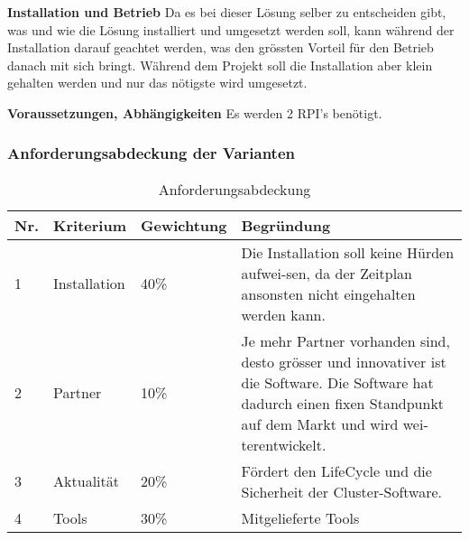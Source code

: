 \textbf{Installation und Betrieb}\newline
Da es bei dieser Lösung selber zu entscheiden gibt, was und wie die Lösung installiert und umgesetzt werden soll, kann während der Installation darauf geachtet werden, was den grössten Vorteil für den Betrieb danach mit sich bringt. Während dem Projekt soll die Installation aber klein gehalten werden und nur das nötigste wird umgesetzt. 

\textbf{Voraussetzungen, Abhängigkeiten}\newline
Es werden 2 RPI's benötigt.

\subsubsection{Anforderungsabdeckung der Varianten}

\begin{table}[H]
\centering
\begin{tabular}{p{1cm}p{2.5cm}p{2.2cm}p{10.3cm}}
\hline
\rowcolor{heading} \textbf{Nr.} & \textbf{Kriterium} & \textbf{Gewichtung} &\textbf{Begründung} \\\hline
1 & Installation & 40\% & Die Installation soll keine Hürden aufwei-sen, da der Zeitplan ansonsten nicht eingehalten werden kann. \\\hline
2 & Partner & 10\% & Je mehr Partner vorhanden sind, desto grösser und innovativer ist die Software. Die Software hat dadurch einen fixen Standpunkt auf dem Markt und wird wei-terentwickelt. \\\hline
3 & Aktualität & 20\% & Fördert den LifeCycle und die Sicherheit der Cluster-Software. \\\hline
4 & Tools & 30\% & Mitgelieferte Tools \\\hline
\end{tabular}
\caption{Anforderungsabdeckung}
\end{table}

